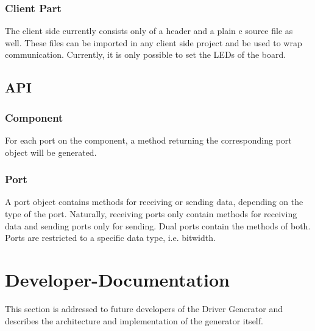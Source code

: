 \documentclass{report}
\begin{document}
\subsection{Client Part}
The client side currently consists only of a header and a plain c source file as well. These files can be imported in any client side project and be used to wrap communication. Currently, it is only possible to set the LEDs of the board.

\section{API}

\subsection{Component}
For each port on the component, a method returning the corresponding port object will be generated.

\subsection{Port}
A port object contains methods for receiving or sending data, depending on the type of the port. Naturally, receiving ports only contain methods for receiving data and sending ports only for sending. Dual ports contain the methods of both. Ports are restricted to a specific data type, i.e. bitwidth.

\chapter{Developer-Documentation}
\label{sec:devDoc}
This section is addressed to future developers of the Driver Generator and describes the architecture and implementation of the generator itself.
\end{document}
